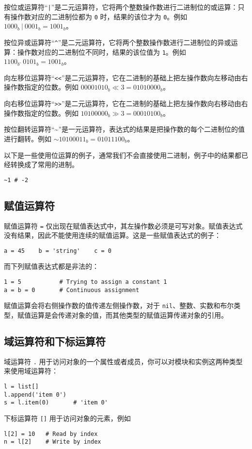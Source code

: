 按位或运算符``\texttt{|}''是二元运算符，它将两个整数操作数进行二进制位的或运算：只有操作数对应的二进制位都为 \texttt{0} 时，结果的该位才为 \texttt{0}。例如 $1000_b\ |\ 0001_b = 1001_b$。

按位异或运算符``\texttt{\textasciicircum}''是二元运算符，它将两个整数操作数进行二进制位的异或运算：操作数对应的二进制位不同时，结果的该位值为 \texttt{1}。例如 $1100_b\ \hat{}\ 0101_b = 1001_b$。

向左移位运算符``\texttt{<<}''是二元运算符，它在二进制的基础上把左操作数向左移动由右操作数指定的位数。例如 $00001010_b \ll 3 = 01010000_b$。

向右移位运算符``\texttt{>>}''是二元运算符，它在二进制的基础上把左操作数向右移动由右操作数指定的位数。例如 $10100000_b \gg 3 = 00010100_b$。

按位翻转运算符``\textasciitilde''是一元运算符，表达式的结果是把操作数的每个二进制位的值进行翻转。例如 $\mathtt{\sim}10100011_b = 01011100_b$。

以下是一些使用位运算的例子，通常我们不会直接使用二进制，例子中的结果都已经转换成了常用的进制。
\begin{lstlisting}[language=berry, numbers=none]
~1 # -2
\end{lstlisting}

\subsection{赋值运算符} \label{section::assign_operator}

赋值运算符 \texttt{=} 仅出现在赋值表达式中，其左操作数必须是可写对象。赋值表达式没有结果，因此不能使用连续的赋值运算。这是一些赋值表达式的例子：
\begin{lstlisting}[language=berry, numbers=none]
a = 45    b = 'string'    c = 0
\end{lstlisting}
而下列赋值表达式都是非法的：
\begin{lstlisting}[language=berry, numbers=none]
1 = 5           # Trying to assign a constant 1
a = b = 0       # Continuous assignment
\end{lstlisting}

赋值运算会将右侧操作数的值传递左侧操作数，对于 \texttt{nil}、整数、实数和布尔类型，赋值运算是会传递对象的值，而其他类型的赋值运算传递对象的引用。

\subsection{域运算符和下标运算符}

域运算符 \texttt{.} 用于访问对象的一个属性或者成员，你可以对模块和实例这两种类型来使用域运算符：
\begin{lstlisting}[language=berry, numbers=none]
l = list[]
l.append('item 0')
s = l.item(0)       # 'item 0'
\end{lstlisting}

下标运算符 \texttt{[]} 用于访问对象的元素，例如
\begin{lstlisting}[language=berry, numbers=none]
l[2] = 10   # Read by index
n = l[2]    # Write by index
\end{lstlisting}
